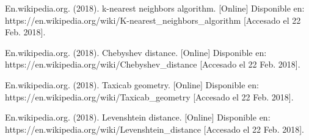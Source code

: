 \documentclass[conference]{IEEEtran}
\begin{document}
\begin{thebibliography}{1}


En.wikipedia.org. (2018). k-nearest neighbors algorithm. [Online] Disponible en: https://en.wikipedia.org/wiki/K-nearest\_neighbors\_algorithm [Accesado el 22 Feb. 2018].

En.wikipedia.org. (2018). Chebyshev distance. [Online] Disponible en: https://en.wikipedia.org/wiki/Chebyshev\_distance [Accesado el 22 Feb. 2018].

En.wikipedia.org. (2018). Taxicab geometry. [Online] Disponible en: https://en.wikipedia.org/wiki/Taxicab\_geometry [Accesado el 22 Feb. 2018].

En.wikipedia.org. (2018). Levenshtein distance. [Online] Disponible en: https://en.wikipedia.org/wiki/Levenshtein\_distance [Accesado el 22 Feb. 2018].

\end{thebibliography}
\end{document}
